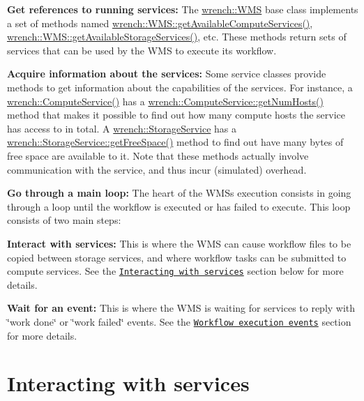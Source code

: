 \begin{DoxyEnumerate}
\item {\bfseries Get references to running services\+:} The {\ttfamily \hyperlink{classwrench_1_1_w_m_s}{wrench\+::\+W\+MS}} base class implements a set of methods named {\ttfamily \hyperlink{classwrench_1_1_w_m_s_a6a2c05d2a60ce335588a25a1b0b7a8e3}{wrench\+::\+W\+M\+S\+::get\+Available\+Compute\+Services()}}, {\ttfamily \hyperlink{classwrench_1_1_w_m_s_aa5a5f673888e1a455ef9fbaff531cb0c}{wrench\+::\+W\+M\+S\+::get\+Available\+Storage\+Services()}}, etc. These methods return sets of services that can be used by the W\+MS to execute its workflow.
\item {\bfseries Acquire information about the services\+:} Some service classes provide methods to get information about the capabilities of the services. For instance, a {\ttfamily \hyperlink{classwrench_1_1_compute_service}{wrench\+::\+Compute\+Service()}} has a {\ttfamily \hyperlink{classwrench_1_1_compute_service_a1b576a22529bd638e6998f0513a44b36}{wrench\+::\+Compute\+Service\+::get\+Num\+Hosts()}} method that makes it possible to find out how many compute hosts the service has access to in total. A {\ttfamily \hyperlink{classwrench_1_1_storage_service}{wrench\+::\+Storage\+Service}} has a {\ttfamily \hyperlink{classwrench_1_1_storage_service_a600a2fc0da8e1c5f1159509f09c2f2f6}{wrench\+::\+Storage\+Service\+::get\+Free\+Space()}} method to find out have many bytes of free space are available to it. Note that these methods actually involve communication with the service, and thus incur (simulated) overhead.
\item {\bfseries Go through a main loop\+:} The heart of the W\+MS\textquotesingle{}s execution consists in going through a loop until the workflow is executed or has failed to execute. This loop consists of two main steps\+:
\begin{DoxyItemize}
\item {\bfseries Interact with services\+:} This is where the W\+MS can cause workflow files to be copied between storage services, and where workflow tasks can be submitted to compute services. See the \href{#wrench-101-WMS-services}{\tt Interacting with services} section below for more details.
\item {\bfseries Wait for an event\+:} This is where the W\+MS is waiting for services to reply with \char`\"{}work done\char`\"{} or \char`\"{}work failed\char`\"{} events. See the \href{#wrench-101-WMS-events}{\tt Workflow execution events} section for more details.
\end{DoxyItemize}
\end{DoxyEnumerate}\hypertarget{wrench-101_wrench-101-WMS-services}{}\section{Interacting with services}\label{wrench-101_wrench-101-WMS-services}
